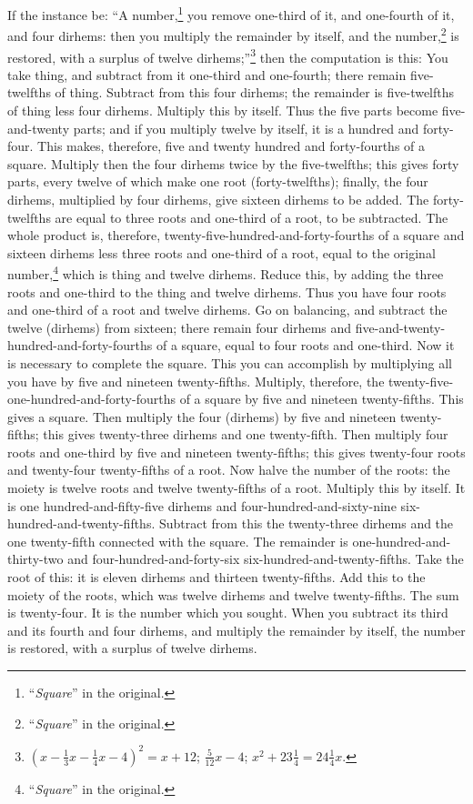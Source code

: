 If the instance be: ``A number,\footnote{``\textit{Square}'' in the original.} you remove one-third of it, and one-fourth of it, and four dirhems: then you multiply the remainder by itself, and the number,\footnote{``\textit{Square}'' in the original.} is restored, with a surplus of twelve dirhems;''\footnote{$(x - \frac{1}{3}x - \frac{1}{4}x - 4)^2 = x + 12$; $\frac{5}{12}x - 4$; $x^2 + 23\frac{1}{4} = 24\frac{1}{4}x$.} then the computation is this: You take thing, and subtract from it one-third and one-fourth; there remain five-twelfths of thing. Subtract from this four dirhems; the remainder is five-twelfths of thing less four dirhems. Multiply this by itself. Thus the five parts become five-and-twenty parts; and if you multiply twelve by itself, it is a hundred and forty-four. This makes, therefore, five and twenty hundred and forty-fourths of a square. Multiply then the four dirhems twice by the five-twelfths; this gives forty parts, every twelve of which make one root (forty-twelfths); finally, the four dirhems, multiplied by four dirhems, give sixteen dirhems to be added. The forty-twelfths are equal to three roots and one-third of a root, to be subtracted. The whole product is, therefore, twenty-five-hundred-and-forty-fourths of a square and sixteen dirhems less three roots and one-third of a root, equal to the original number,\footnote{``\textit{Square}'' in the original.} which is thing and twelve dirhems. Reduce this, by adding the three roots and one-third to the thing and twelve dirhems. Thus you have four roots and one-third of a root and twelve dirhems. Go on balancing, and subtract the twelve (dirhems) from sixteen; there remain four dirhems and five-and-twenty-hundred-and-forty-fourths of a square, equal to four roots and one-third. Now it is necessary to complete the square. This you can accomplish by multiplying all you have by five and nineteen twenty-fifths. Multiply, therefore, the twenty-five-one-hundred-and-forty-fourths of a square by five and nineteen twenty-fifths. This gives a square. Then multiply the four (dirhems) by five and nineteen twenty-fifths; this gives twenty-three dirhems and one twenty-fifth. Then multiply four roots and one-third by five and nineteen twenty-fifths; this gives twenty-four roots and twenty-four twenty-fifths of a root. Now halve the number of the roots: the moiety is twelve roots and twelve twenty-fifths of a root. Multiply this by itself. It is one hundred-and-fifty-five dirhems and four-hundred-and-sixty-nine six-hundred-and-twenty-fifths. Subtract from this the twenty-three dirhems and the one twenty-fifth connected with the square. The remainder is one-hundred-and-thirty-two and four-hundred-and-forty-six six-hundred-and-twenty-fifths. Take the root of this: it is eleven dirhems and thirteen twenty-fifths. Add this to the moiety of the roots, which was twelve dirhems and twelve twenty-fifths. The sum is twenty-four. It is the number which you sought. When you subtract its third and its fourth and four dirhems, and multiply the remainder by itself, the number is restored, with a surplus of twelve dirhems.


